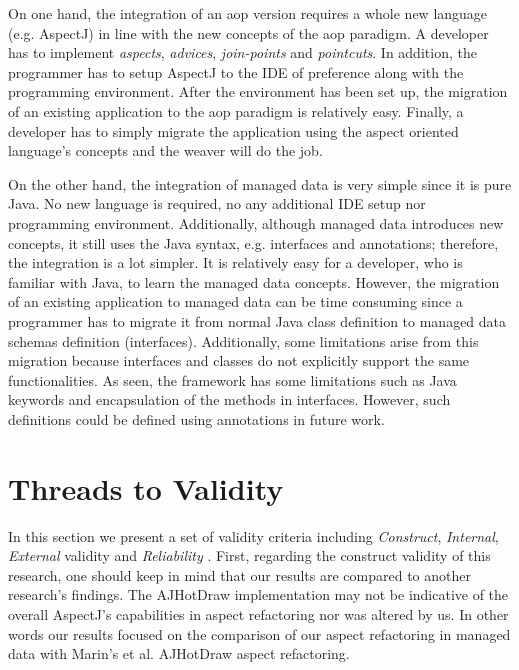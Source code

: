 On one hand, the integration of an \ac{aop} version requires a whole new language (e.g. AspectJ) in line with the new concepts of the \ac{aop} paradigm.
A developer has to implement \textit{aspects}, \textit{advices}, \textit{join-points} and \textit{pointcuts}. 
In addition, the programmer has to setup AspectJ to the IDE of preference along with the programming environment.
After the environment has been set up, the migration of an existing application to the \ac{aop} paradigm is relatively easy.
Finally, a developer has to simply migrate the application using the aspect oriented language's concepts and the weaver will do the job.

On the other hand, the integration of managed data is very simple since it is pure Java.
No new language is required, no any additional IDE setup nor programming environment.
Additionally, although managed data introduces new concepts, it still uses the Java syntax, e.g. interfaces and annotations; therefore, the integration is a lot simpler.
It is relatively easy for a developer, who is familiar with Java, to learn the managed data concepts.
However, the migration of an existing application to managed data can be time consuming since a programmer has to migrate it from normal Java class definition  to managed data schemas definition (interfaces).
Additionally, some limitations arise from this migration because interfaces and classes do not explicitly support the same functionalities.
As seen, the framework has some limitations such as Java keywords and encapsulation of the methods in interfaces.
However, such definitions could be defined using annotations in future work.

\section{Threads to Validity}
In this section we present a set of validity criteria including \textit{Construct}, \textit{Internal}, \textit{External} validity and \textit{Reliability} \cite{easterbrook2008selecting}.
First, regarding the construct validity of this research, one should keep in mind that our results are compared to another research's findings. 
The AJHotDraw implementation may not be indicative of the overall AspectJ's capabilities in aspect refactoring nor was altered by us.
In other words our results focused on the comparison of our aspect refactoring in managed data with Marin's et al. AJHotDraw aspect refactoring.

